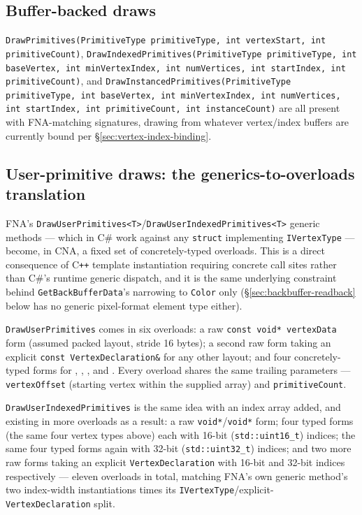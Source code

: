 \subsection{Buffer-backed draws}

\texttt{DrawPrimitives(PrimitiveType primitiveType, int vertexStart, int primitiveCount)},
\texttt{DrawIndexedPrimitives(PrimitiveType primitiveType, int baseVertex, int minVertexIndex,
int numVertices, int startIndex, int primitiveCount)}, and
\texttt{DrawInstancedPrimitives(PrimitiveType primitiveType, int baseVertex, int minVertexIndex,
int numVertices, int startIndex, int primitiveCount, int instanceCount)} are all present with
FNA-matching signatures, drawing from whatever vertex/index buffers are currently bound per
\S\ref{sec:vertex-index-binding}.

\subsection{User-primitive draws: the generics-to-overloads translation}

FNA's \texttt{DrawUserPrimitives<T>}/\texttt{DrawUserIndexedPrimitives<T>} generic methods ---
which in C\# work against any \texttt{struct} implementing \texttt{IVertexType} --- become, in
CNA, a fixed set of concretely-typed overloads. This is a direct consequence of C\texttt{++}
template instantiation requiring concrete call sites rather than C\#'s runtime generic
dispatch, and it is the same underlying constraint behind \texttt{GetBackBufferData}'s
narrowing to \texttt{Color} only (\S\ref{sec:backbuffer-readback} below has no generic
pixel-format element type either).

\texttt{DrawUserPrimitives} comes in six overloads: a raw \texttt{const void* vertexData}
form (assumed  packed layout, stride 16 bytes); a second raw form
taking an explicit \texttt{const VertexDeclaration\&} for any other layout; and four
concretely-typed forms for , ,
, and . Every overload
shares the same trailing parameters --- \texttt{vertexOffset} (starting vertex within the
supplied array) and \texttt{primitiveCount}.

\texttt{DrawUserIndexedPrimitives} is the same idea with an index array added, and existing in
more overloads as a result: a raw \texttt{void*}/\texttt{void*} form; four typed forms
(the same four vertex types above) each with 16-bit (\texttt{std::uint16\_t}) indices; the same
four typed forms again with 32-bit (\texttt{std::uint32\_t}) indices; and two more raw forms
taking an explicit \texttt{VertexDeclaration} with 16-bit and 32-bit indices respectively ---
eleven overloads in total, matching FNA's own generic method's two index-width instantiations
times its \texttt{IVertexType}/explicit-\texttt{VertexDeclaration} split.

